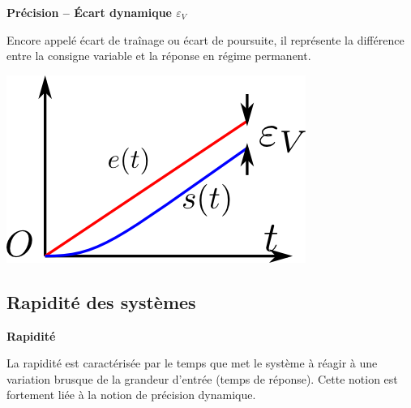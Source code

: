 \documentclass[10pt,fleqn]{article} %
\begin{document}
\begin{defi}
\textbf{Précision -- Écart dynamique  $\varepsilon_V$}

\begin{minipage}[c]{0.7\textwidth}
Encore appelé écart de traînage ou
écart de poursuite, il représente la différence entre la consigne variable et
la réponse en régime permanent. 
\end{minipage}\hfill
\begin{minipage}[c]{0.2\textwidth}
 \begin{center}
 \includegraphics[width=\textwidth]{images/precision_dyn}
 \end{center}
\end{minipage}

\end{defi}


\subsection{Rapidité des systèmes}
\begin{defi}
\textbf{Rapidité}

La rapidité est caractérisée par le temps que met le système à réagir à une
variation brusque de la grandeur d'entrée (temps de réponse). Cette notion est
fortement liée à la notion de précision dynamique.%

\end{defi}
\end{document}
